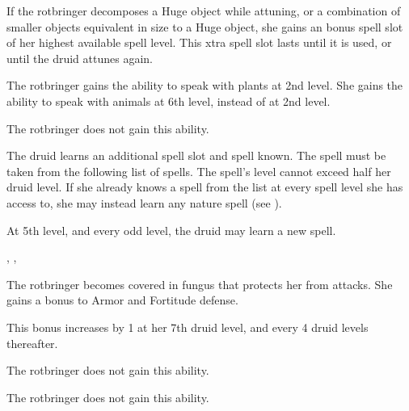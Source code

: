 If the rotbringer decomposes a Huge object while attuning, or a combination of smaller objects equivalent in size to a Huge object, she gains an bonus spell slot of her highest available spell level.
This xtra spell slot lasts until it is used, or until the druid attunes again.

 The rotbringer gains the ability to speak with plants at 2nd level.
She gains the ability to speak with animals at 6th level, instead of at 2nd level.

 The rotbringer does not gain this ability.

 The druid learns an additional spell slot and spell known.
The spell must be taken from the following list of spells.
The spell's level cannot exceed half her druid level.
If she already knows a spell from the list at every spell level she has access to, she may instead learn any nature spell (see ).

At 5th level, and every odd level, the druid may learn a new spell.

 , 
 
 
 
 , 

 The rotbringer becomes covered in fungus that protects her from attacks. She gains a  bonus to Armor and Fortitude defense.

This bonus increases by 1 at her 7th druid level, and every 4 druid levels thereafter.

 The rotbringer does not gain this ability.

 The rotbringer does not gain this ability.

